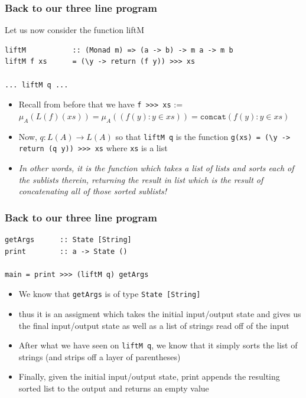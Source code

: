 \documentclass[xcolor=pdftex,dvipsnames,table]{beamer}
\begin{document}
\begin{frame}[fragile]
    \frametitle{Back to our three line program}
    Let us now consider the function liftM
    {\scriptsize
\begin{lstlisting}
liftM           :: (Monad m) => (a -> b) -> m a -> m b
liftM f xs      = (\y -> return (f y)) >>> xs

... liftM q ...
\end{lstlisting}
}
    \begin{itemize}
        \item Recall from before that we have \verb|f >>> xs| :=
            $\mu_A(L(f)(xs)) = \mu_A ( (f(y) : y\in xs) ) =
            \mathtt{concat} (f(y) : y \in xs)$ \pause
        \item Now, $q : L(A) \rightarrow L(A)$ so that \verb|liftM q|
            is the function \verb|g(xs) = (\y -> return (q y)) >>> xs|
            where \texttt{xs} is a list \pause
        \item \textit{In other words, it is the function which takes a
            list of lists and sorts each of the sublists therein,
            returning the result in list which is the result of
            concatenating all of those sorted sublists!}
    \end{itemize}
\end{frame}

\begin{frame}[fragile]
    \frametitle{Back to our three line program}
\begin{lstlisting}
getArgs      :: State [String]
print        :: a -> State ()

main = print >>> (liftM q) getArgs
\end{lstlisting}
    \begin{itemize}
        \item We know that \verb|getArgs| is of type \verb|State [String]| \pause
        \item thus it is an assigment which takes the initial
            input/output state and gives us the final input/output
            state as well as a list of strings read off of the input
            \pause
        \item After what we have seen on \verb|liftM q|, we know that
            it simply sorts the list of strings (and strips off a layer
            of parentheses) \pause
        \item Finally, given the initial input/output state, print
            appends the resulting sorted list to the output and
            returns an empty value
    \end{itemize}
\end{frame}
\end{document}
